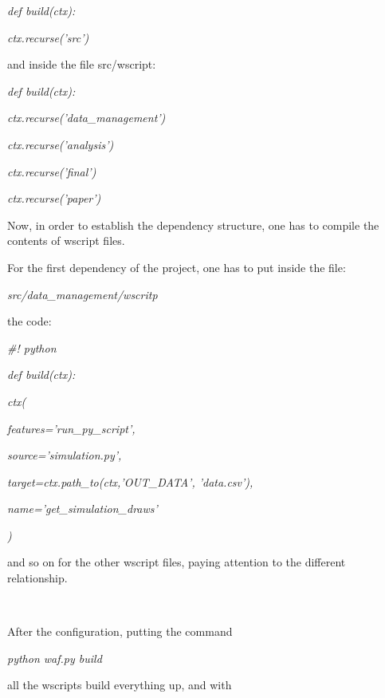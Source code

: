 \documentclass[11pt]{article}
\begin{document}
{\raggedright
\textit{{\small def build(ctx):}}
}

{\raggedright
\textit{{\small     ctx.recurse('src')}}
}

{\raggedright
{\small and inside the file src/wscript:}
}

{\raggedright
\textit{{\small def build(ctx):}}
}

{\raggedright
\textit{{\small     ctx.recurse('data\_management')}}
}

{\raggedright
\textit{{\small     ctx.recurse('analysis')}}
}

{\raggedright
\textit{{\small     ctx.recurse('final')}}
}

{\raggedright
\textit{{\small     ctx.recurse('paper')}}
}

{\raggedright
{\small Now, in order to establish the dependency structure, one has to compile the contents of wscript files.
}
}

{\raggedright
{\small 
For the first dependency of the project, one has to put inside the file:}
}

{\raggedright
\textit{{\small src/data\_management/wscritp}}
}

{\raggedright
{\small the code:}
}

{\raggedright
\textit{{\small \#! python}}
}

{\raggedright
\textit{{\small def build(ctx):}}
}

{\raggedright
\textit{{\small     ctx(}}
}

{\raggedright
\textit{{\small         features='run\_py\_script',}}
}

{\raggedright
\textit{{\small         source='simulation.py',}}
}

{\raggedright
\textit{{\small         target=ctx.path\_to(ctx,'OUT\_DATA', 'data.csv'),}}
}

{\raggedright
\textit{{\small         name='get\_simulation\_draws'}}
}

{\raggedright
\textit{{\small     )}}
}

{\raggedright
{\small and so on for the other wscript files, paying attention to the different relationship.}
}\\

{\raggedright
{\small After the configuration, putting the command}
}

{\raggedright
\textit{{\small python waf.py build}}
}

{\raggedright
{\small all the wscripts build everything up, and with}
}
\end{document}
